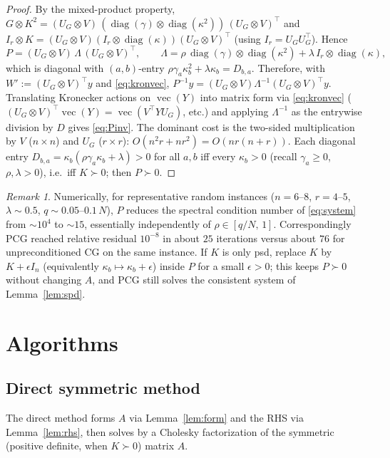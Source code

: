 \documentclass[12pt]{article}
\DeclareMathOperator{\vecop}{vec}
\DeclareMathOperator{\diag}{diag}
\theoremstyle{remark}
\newtheorem{remark}{Remark}
\begin{document}
\begin{proof}
By the mixed-product property, $G\otimes K^2 = (U_G\otimes V)\,(\diag(\gamma)\otimes\diag(\kappa^2))\,(U_G\otimes V)^{\!\top}$ and $I_r\otimes K=(U_G\otimes V)(I_r\otimes\diag(\kappa))(U_G\otimes V)^{\!\top}$ (using $I_r=U_GU_G^{\!\top}$). Hence
\[
  P=(U_G\otimes V)\,\Lambda\,(U_G\otimes V)^{\!\top},\qquad
  \Lambda=\rho\,\diag(\gamma)\otimes\diag(\kappa^2)+\lambda\,I_r\otimes\diag(\kappa),
\]
which is diagonal with $(a,b)$-entry $\rho\gamma_a\kappa_b^2+\lambda\kappa_b=D_{b,a}$. Therefore, with $W'\!:=(U_G\otimes V)^{\!\top}y$ and \eqref{eq:kronvec},
$ P^{-1}y=(U_G\otimes V)\Lambda^{-1}(U_G\otimes V)^{\!\top}y$. Translating Kronecker actions on $\vecop(Y)$ into matrix form via \eqref{eq:kronvec} ($(U_G\otimes V)^{\!\top}\vecop(Y)=\vecop(V^{\!\top}YU_G)$, etc.) and applying $\Lambda^{-1}$ as the entrywise division by $D$ gives \eqref{eq:Pinv}. The dominant cost is the two-sided multiplication by $V$ ($n\times n$) and $U_G$ ($r\times r$): $O(n^2r+nr^2)=O(nr(n+r))$. Each diagonal entry $D_{b,a}=\kappa_b(\rho\gamma_a\kappa_b+\lambda)>0$ for all $a,b$ iff every $\kappa_b>0$ (recall $\gamma_a\ge0$, $\rho,\lambda>0$), i.e.\ iff $K\succ0$; then $P\succ0$.
\end{proof}

\begin{remark}\label{rem:rho}
Numerically, for representative random instances ($n=6$--$8$, $r=4$--$5$, $\lambda\sim 0.5$, $q\sim 0.05$--$0.1\,N$), $P$ reduces the spectral condition number of \eqref{eq:system} from $\sim 10^4$ to $\sim 15$, essentially independently of $\rho\in[q/N,\,1]$. Correspondingly PCG reached relative residual $10^{-8}$ in about $25$ iterations versus about $76$ for unpreconditioned CG on the same instance. If $K$ is only psd, replace $K$ by $K+\epsilon I_n$ (equivalently $\kappa_b\mapsto\kappa_b+\epsilon$) inside $P$ for a small $\epsilon>0$; this keeps $P\succ0$ without changing $A$, and PCG still solves the consistent system of Lemma~\ref{lem:spd}.
\end{remark}

\section{Algorithms}

\subsection{Direct symmetric method}

The direct method forms $A$ via Lemma~\ref{lem:form} and the RHS via Lemma~\ref{lem:rhs}, then solves by a Cholesky factorization of the symmetric (positive definite, when $K\succ0$) matrix $A$.
\end{document}

